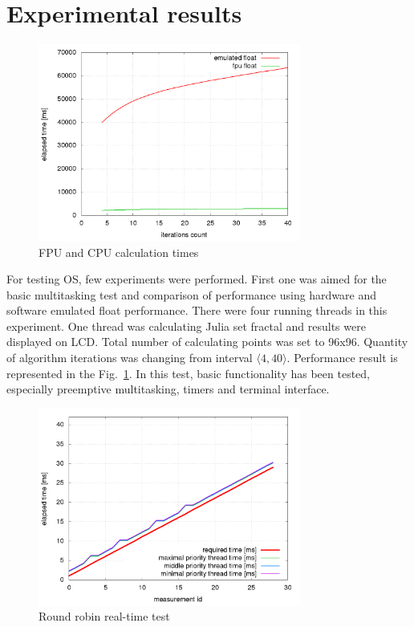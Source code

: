\documentclass[a4paper, conference]{IEEEtran}
\begin{document}
\section{Experimental results}

\begin{figure}[]
\centering
\includegraphics[width=3.4in]{fpu_cpu_performance.png}
\caption{FPU and CPU calculation times}
\label{fig_fpu_cpu}
\end{figure}

For testing OS, few experiments were performed. First one was aimed for the basic multitasking test and comparison of performance using hardware and software emulated float performance.
There were four running threads in this experiment. One thread was calculating Julia set fractal and results were displayed on LCD. Total number of calculating points was set to 96x96.
Quantity of algorithm iterations was changing from interval $\langle 4, 40 \rangle$. Performance result is represented in the Fig.~\ref{fig_fpu_cpu}. In this test, basic functionality has been tested, especially preemptive multitasking, timers and terminal interface.



\begin{figure}[b]
\centering
\includegraphics[width=3.4in]{round_robin_scheduler_perfomance.png}
\caption{Round robin real-time test}
\label{fig_round_robin_scheduler_perfomance}
\end{figure}
\end{document}

